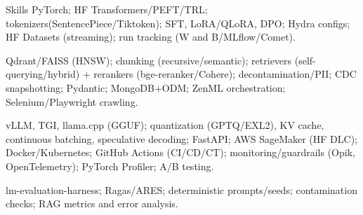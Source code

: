 


\begin{rubric}{Skills}
\noentry{~}
PyTorch; HF Transformers/PEFT/TRL; tokenizers(SentencePiece/Tiktoken); SFT, LoRA/QLoRA, DPO; Hydra configs; HF Datasets (streaming);
run tracking (W and B/MLflow/Comet).

Qdrant/FAISS (HNSW); chunking (recursive/semantic); retrievers (self-querying/hybrid) + rerankers (bge-reranker/Cohere); decontamination/PII; CDC snapshotting; Pydantic; MongoDB+ODM; ZenML orchestration; Selenium/Playwright crawling.

\entry*[MLOps]
vLLM, TGI, llama.cpp (GGUF); quantization (GPTQ/EXL2), KV cache, continuous batching, speculative decoding; FastAPI; AWS SageMaker (HF DLC); Docker/Kubernetes; GitHub Actions (CI/CD/CT); monitoring/guardrails (Opik, OpenTelemetry); PyTorch Profiler; A/B testing.

\entry*[Evaluation]
lm-evaluation-harness; Ragas/ARES; deterministic prompts/seeds; contamination checks; RAG metrics and error analysis.
\end{rubric}




